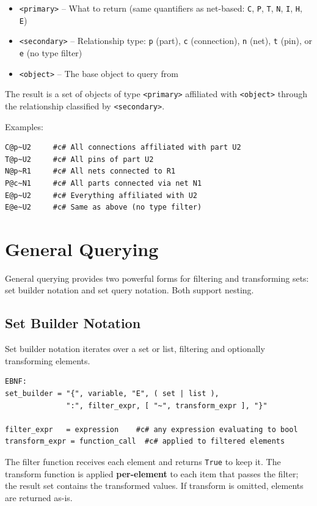\begin{itemize}
\item \texttt{<primary>} -- What to return (same quantifiers as net-based: \texttt{C}, \texttt{P}, \texttt{T}, \texttt{N}, \texttt{I}, \texttt{H}, \texttt{E})
\item \texttt{<secondary>} -- Relationship type: \texttt{p} (part), \texttt{c} (connection), \texttt{n} (net), \texttt{t} (pin), or \texttt{e} (no type filter)
\item \texttt{<object>} -- The base object to query from
\end{itemize}

The result is a set of objects of type \texttt{<primary>} affiliated with \texttt{<object>} through the relationship classified by \texttt{<secondary>}.

Examples:
\begin{verbatim}
C@p~U2     #c# All connections affiliated with part U2
T@p~U2     #c# All pins of part U2
N@p~R1     #c# All nets connected to R1
P@c~N1     #c# All parts connected via net N1
E@p~U2     #c# Everything affiliated with U2
E@e~U2     #c# Same as above (no type filter)
\end{verbatim}

\section{General Querying}
\label{sec:general-querying}
General querying provides two powerful forms for filtering and transforming sets: set builder notation and set query notation. Both support nesting.

\subsection{Set Builder Notation}
Set builder notation iterates over a set or list, filtering and optionally transforming elements.
\begin{verbatim}
EBNF:
set_builder = "{", variable, "E", ( set | list ), 
              ":", filter_expr, [ "~", transform_expr ], "}"

filter_expr   = expression    #c# any expression evaluating to bool
transform_expr = function_call  #c# applied to filtered elements
\end{verbatim}

The filter function receives each element and returns \texttt{True} to keep it. The transform function is applied \textbf{per-element} to each item that passes the filter; the result set contains the transformed values. If transform is omitted, elements are returned as-is.

